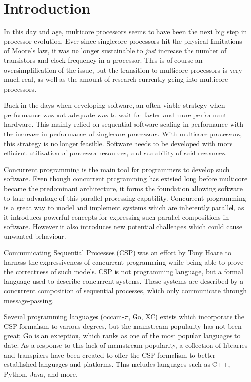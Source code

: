 
\chapter{Introduction}
\label{ch:introduction}


In this day and age, multicore processors seems to have been the next big step in processor evol\-ution. Ever since singlecore processors hit the physical limitations of Moore's law, it was no longer sustainable to \textit{just} increase the number of transistors and clock frequency in a processor. This is of course an oversimplification of the issue, but the transition to multicore processors is very much real, as well as the amount of research currently going into multicore processors.


Back in the days when developing software, an often viable strategy when performance was not adequate was to wait for faster and more performant hardware. This mainly relied on sequential software scaling in performance with the increase in performance of singlecore processors. With multicore processors, this strategy is no longer feasible. Software needs to be developed with more efficient utilization of processor resources, and scalability of said resources. 


Concurrent programming is the main tool for programmers to develop such software. Even though concurrent programming has existed long before multicore became the predominant architecture, it forms the foundation allowing software to take advantage of this parallel processing capability. Concurrent programming is a great way to model and implement systems which are inherently parallel, as it introduces powerful concepts for expressing such parallel compositions in software. However it also introduces new potential challenges which could cause unwanted behaviour.


Communicating Sequential Processes (CSP) was an effort by Tony Hoare to harness the expressiveness of concurrent programming while being able to prove the correctness of such models. CSP is not programming language, but a formal language used to describe concurrent systems. These systems are described by a concurrent composition of sequential processes, which only communicate through message-passing.


Several programming languages (occam-$\pi$, Go, XC) exists which incorporate the CSP formalism to various degrees, but the mainstream popularity has not been great; Go is an exception, which ranks as one of the most popular languages to date. As a response to this lack of mainstream popularity, a collection of libraries and transpilers have been created to offer the CSP formalism to better established languages and platforms. This includes languages such as C++, Python, Java, and more. 


